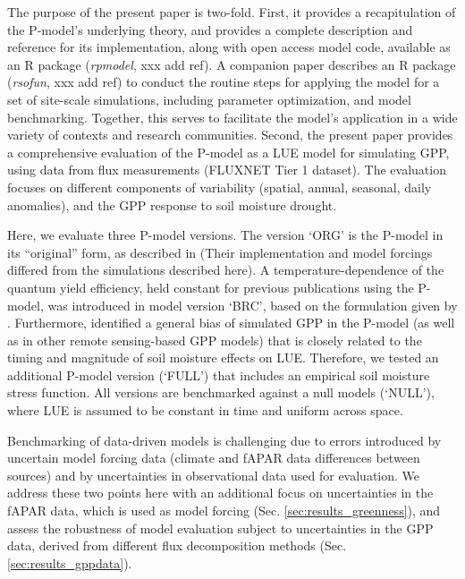 \documentclass{myreport}
\begin{document}
The purpose of the present paper is two-fold. First, it provides a recapitulation of the P-model's underlying theory, and provides a complete description and reference for its implementation, along with open access model code, available as an R package (\textit{rpmodel}, xxx add ref). A companion paper describes an R package (\textit{rsofun}, xxx add ref) to conduct the routine steps for applying the model for a set of site-scale simulations, including parameter optimization, and model benchmarking. Together, this serves to facilitate the model's application in a wide variety of contexts and research communities. Second, the present paper provides a comprehensive evaluation of the P-model as a LUE model for simulating GPP, using data from flux measurements (FLUXNET Tier 1 dataset). The evaluation focuses on different components of variability (spatial, annual, seasonal, daily anomalies), and the GPP response to soil moisture drought.

Here, we evaluate three P-model versions. The version `ORG' is the P-model in its ``original'' form, as described in \cite{wang17natpl} (Their implementation and model forcings differed from the simulations described here). A temperature-dependence of the quantum yield efficiency, held constant for previous publications using the P-model, was introduced in model version `BRC', based on the formulation given by \cite{bernacchi03pce}. Furthermore, \cite{stocker19natgeo} identified a general bias of simulated GPP in the P-model (as well as in other remote sensing-based GPP models) that is closely related to the timing and magnitude of soil moisture effects on LUE. Therefore, we tested an additional P-model version (`FULL') that includes an empirical soil moisture stress function. All versions are benchmarked against a null models (`NULL'), where LUE is assumed to be constant in time and uniform across space. %

Benchmarking of data-driven models is challenging due to errors introduced by uncertain model forcing data \citep{ryu19rse} (climate and fAPAR data differences between sources) and by uncertainties in observational data used for evaluation. We address these two points here with an additional focus on uncertainties in the fAPAR data, which is used as model forcing (Sec. \ref{sec:results_greenness}), and assess the robustness of model evaluation subject to uncertainties in the GPP data, derived from different flux decomposition methods (Sec. \ref{sec:results_gppdata}). 
\end{document}
